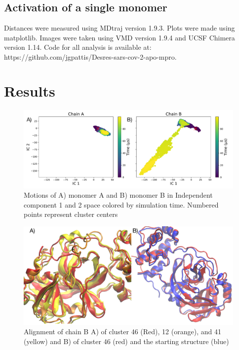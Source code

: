 \documentclass{biophys-new}
\begin{document}
\subsection*{Activation of a single monomer}

Distances were measured using MDtraj version 1.9.3.\cite{McGibbon2015MDTraj} Plots were made using matplotlib.\cite{Hunter:2007} Images were taken using VMD version 1.9.4\cite{HUMP96} and UCSF Chimera version 1.14.\cite{pettersen2004ucsf} Code for all analysis is available at: https://github.com/jgpattis/Desres-sars-cov-2-apo-mpro.

\section*{Results}

\begin{figure}[h]
\centering
\graphicspath{ {./figures/} }
\includegraphics[width=0.6\linewidth]{fig_1_fdiscolortime_ic2_label.pdf}
\caption{Motions of A) monomer A and B) monomer B in Independent component 1 and 2 space colored by simulation time. Numbered points represent cluster centers}
\label{fig:view}
\end{figure}

\begin{figure}[h]
\graphicspath{ {./figures/} }
\centering
\includegraphics[width=0.6\linewidth]{fig2_IC1_align.pdf}
\caption{Alignment of chain B A) of cluster 46 (Red), 12 (orange), and 41 (yellow) and B) of cluster 46 (red) and the starting structure (blue)}
\label{fig:view}
\end{figure}
\end{document}
